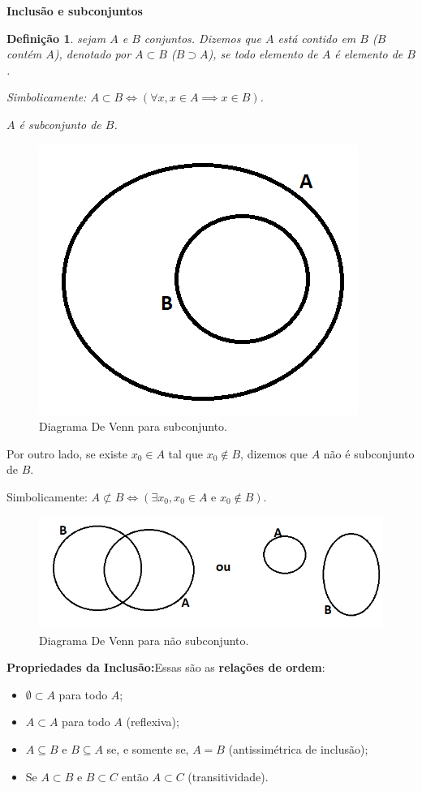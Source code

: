 \documentclass[oneside,a4paper,12pt]{article}
\newtheorem{definition}{Definição}[section]
\begin{document}
\textbf{Inclusão e subconjuntos}

\begin{definition}
	sejam $A$ e $B$ conjuntos. Dizemos que $A$ está contido em $B$ ($B$ contém $A$), denotado por $A \subset B$ ($ B \supset A $), se todo elemento de $A$ é elemento de $B$.
	
	Simbolicamente: $A \subset B \Leftrightarrow (\forall x, x \in A \implies x \in B)$.
	
	$A$ é subconjunto de $B$.
\end{definition}

\begin{figure}[h]
	\centering
	\includegraphics[width=0.3\linewidth]{Figuras/venn2}
	\caption{Diagrama De Venn para subconjunto.}
	\label{venn2}
\end{figure}


Por outro lado, se existe $x_0 \in A$ tal que $x_0 \notin B$, dizemos que $A$ não é subconjunto de $B$.

Simbolicamente: $A \not\subset B \Leftrightarrow (\exists x_0, x_0 \in A \text{ e } x_0 \notin B )$.
	
\begin{figure}[h]
	\centering
	\includegraphics[width=0.5\linewidth]{Figuras/venn3}
	\caption{Diagrama De Venn para não subconjunto.}
	\label{venn3}
\end{figure}

\textbf{Propriedades da Inclusão:}Essas são as \textbf{relações de ordem}:
\begin{itemize}
	\item $\emptyset \subset A$ para todo $A$;
	\item $A \subset A$ para todo $A$ (reflexiva);
	\item $A \subseteq B$ e $B \subseteq A$ se, e somente se, $A=B$ (antissimétrica de inclusão);
	\item Se $A \subset B$ e $B \subset C$ então $A \subset C$ (transitividade).
\end{itemize}
\end{document}
